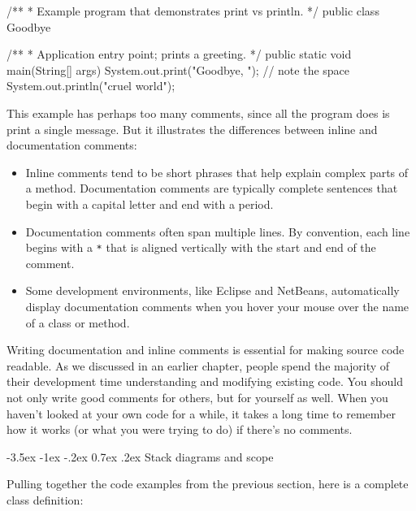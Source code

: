 \documentclass[12pt]{book}
\makeatletter
\theoremstyle{exercise}
\newcommand{\java}[1]{\verb"#1"}
\renewcommand{\section}{\@startsection{section}{1}{\z@}%
    {-3.5ex \@plus -1ex \@minus -.2ex}%
    {0.7ex \@plus.2ex}%
    {\normalfont\Large\bfseries}}
\newcommand{\java}[1]{\lstinline{#1}} %
\makeatother
\begin{document}
\begin{code}
/**
 * Example program that demonstrates print vs println.
 */
public class Goodbye {

    /**
     * Application entry point; prints a greeting.
     */
    public static void main(String[] args) {
        System.out.print("Goodbye, ");  // note the space
        System.out.println("cruel world");
    }

}
\end{code}

This example has perhaps too many comments, since all the program does is print a single message.
But it illustrates the differences between inline and documentation comments:

\begin{itemize}
\item Inline comments tend to be short phrases that help explain complex parts of a method.
Documentation comments are typically complete sentences that begin with a capital letter and end with a period.

\item Documentation comments often span multiple lines.
By convention, each line begins with a \java{*} that is aligned vertically with the start and end of the comment.

\item Some development environments, like Eclipse and NetBeans, automatically display documentation comments when you hover your mouse over the name of a class or method.

\end{itemize}

Writing documentation and inline comments is essential for making source code readable.
As we discussed in an earlier chapter, people spend the majority of their development time understanding and modifying existing code.
You should not only write good comments for others, but for yourself as well.
When you haven't looked at your own code for a while, it takes a long time to remember how it works (or what you were trying to do) if there's no comments.


\section{Stack diagrams and scope}
\label{stack}


Pulling together the code examples from the previous section, here is a complete class definition:
\end{document}
